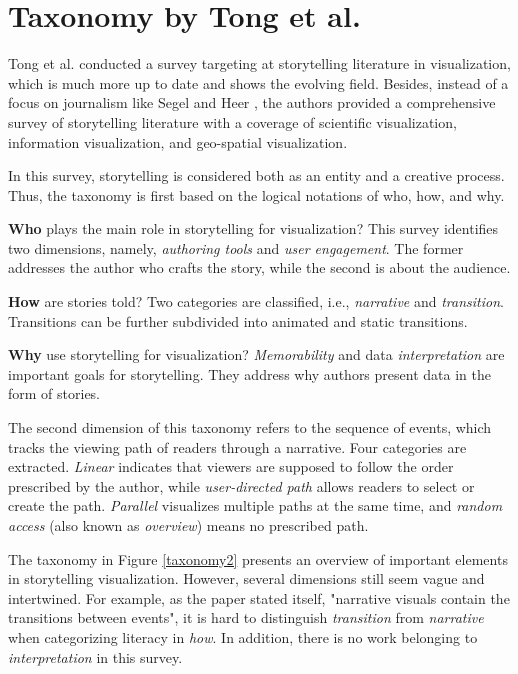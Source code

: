 \section{Taxonomy by Tong et al.}

Tong et al. \cite{Tong2018} conducted a survey targeting at storytelling literature in visualization, which is much more up to date and shows the evolving field. Besides, instead of a focus on journalism like Segel and Heer \cite{Segel2010}, the authors provided a comprehensive survey of storytelling literature with a coverage of scientific visualization, information visualization, and geo-spatial visualization. 

In this survey, storytelling is considered both as an entity and a creative process. Thus, the taxonomy is first based on the logical notations of who, how, and why. 

\begin{compactitem}
	\item \textbf{Who} plays the main role in storytelling for visualization? This survey identifies two dimensions, namely, \textit{authoring tools} and \textit{user engagement}. The former addresses the author who crafts the story, while the second is about the audience. 
	
	\item  \textbf{How} are stories told? Two categories are classified, i.e., \textit{narrative} and \textit{transition}. Transitions can be further subdivided into animated and static transitions. 
	
	\item \textbf{Why} use storytelling for visualization? \textit{Memorability} and data \textit{interpretation} are important goals for storytelling. They address why authors present data in the form of stories.

\end{compactitem}

The second dimension of this taxonomy refers to the sequence of events, which tracks the viewing path of readers through a narrative. Four categories are extracted. \textit{Linear} indicates that viewers are supposed to follow the order prescribed by the author, while \textit{user-directed path} allows readers to select or create the path. \textit{Parallel} visualizes multiple paths at the same time, and \textit{random access} (also known as \textit{overview}) means no prescribed path. 

The taxonomy in Figure \ref{taxonomy2} presents an overview of important elements in storytelling visualization. However, several dimensions still seem vague and intertwined. For example, as the paper stated itself, "narrative visuals contain the transitions between events", it is hard to distinguish \textit{transition} from \textit{narrative} when categorizing literacy in \textit{how}. In addition, there is no work belonging to \textit{interpretation} in this survey. 

